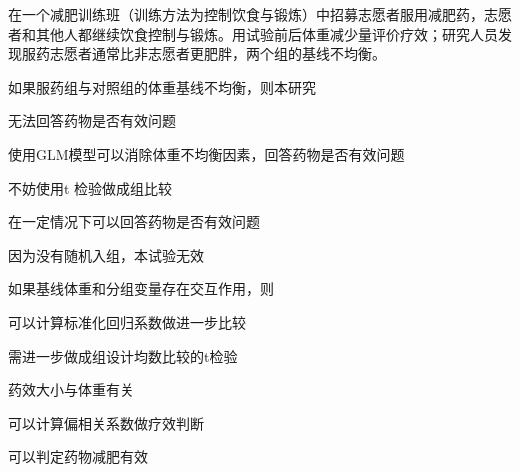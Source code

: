 在一个减肥训练班（训练方法为控制饮食与锻炼）中招募志愿者服用减肥药，志愿者和其他人都继续饮食控制与锻炼。用试验前后体重减少量评价疗效；研究人员发现服药志愿者通常比非志愿者更肥胖，两个组的基线不均衡。


\par\addvspace{6pt}\noindent\begin{minipage}{\linewidth}


如果服药组与对照组的体重基线不均衡，则本研究


\begin{choices}

\item 无法回答药物是否有效问题

\item 使用GLM模型可以消除体重不均衡因素，回答药物是否有效问题

\item 不妨使用t 检验做成组比较

\item 在一定情况下可以回答药物是否有效问题

\item 因为没有随机入组，本试验无效

\end{choices}

\end{minipage}\par\vspace{4pt}

\par\addvspace{6pt}\noindent\begin{minipage}{\linewidth}


如果基线体重和分组变量存在交互作用，则


\begin{choices}

\item 可以计算标准化回归系数做进一步比较

\item 需进一步做成组设计均数比较的t检验

\item 药效大小与体重有关

\item 可以计算偏相关系数做疗效判断

\item 可以判定药物减肥有效

\end{choices}

\end{minipage}\par\vspace{4pt}

